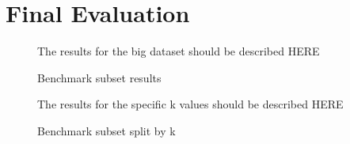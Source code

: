 \documentclass[a4paper,12pt,titlepage, BCOR7mm,headsepline]{scrbook}
\numberwithin{equation}{section}
\begin{document}
\section{Final Evaluation}
\begin{figure}[H]
\caption{Benchmark subset results}
\begin{center}

\end{center}
The results for the big dataset should be described HERE
\end{figure}
\begin{figure}[H]
\caption{Benchmark subset split by k}
\begin{center}
\end{center}
The results for the specific k values should be described HERE
\end{figure}
\end{document}

